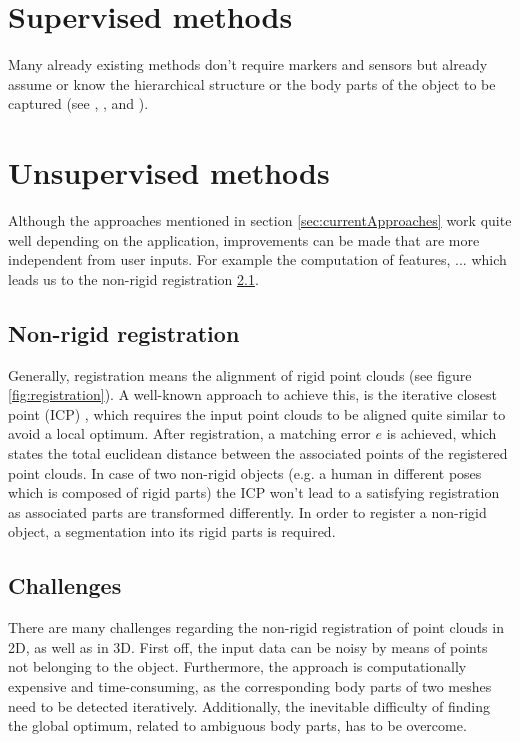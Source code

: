 \section{Supervised methods}
Many already existing methods don't require markers and sensors but already assume or know the hierarchical structure or the body parts of the object to be captured (see \cite{multiLayerSkeleton}, \cite{baker2005shape}, \cite{de2008hierarchical} and \cite{michoud2007real}).

\section{Unsupervised methods}
Although the approaches mentioned in section \ref{sec:currentApproaches} work quite well depending on the application, improvements can be made that are more independent from user inputs. For example the computation of features, ... which leads us to the non-rigid registration \ref{nonrigidregistration}.

\subsection{Non-rigid registration}
\label{nonrigidregistration}

Generally, registration means the alignment of rigid point clouds (see figure \ref{fig:registration}). A well-known approach to achieve this, is the iterative closest point (ICP) \cite{ICP}, which requires the input point clouds to be aligned quite similar to avoid a local optimum. After registration, a matching error $e$ is achieved, which states the total euclidean distance between the associated points of the registered point clouds. In case of two non-rigid objects (e.g. a human in different poses which is composed of rigid parts) the ICP won't lead to a satisfying registration as associated parts are transformed differently. In order to register a non-rigid object, a segmentation into its rigid parts is required.

\subsection{Challenges}
\label{Challenges}
There are many challenges regarding the non-rigid registration of point clouds in 2D, as well as in 3D. First off, the input data can be noisy by means of points not belonging to the object. Furthermore, the approach is computationally expensive and time-consuming, as the corresponding body parts of two meshes need to be detected iteratively. Additionally, the inevitable difficulty of finding the global optimum, related to ambiguous body parts, has to be overcome.

